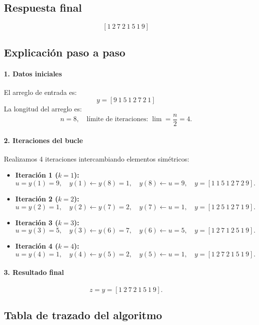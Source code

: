 \documentclass[12pt]{article}
\begin{document}
\subsection*{Respuesta final}

\[
\boxed{[1\ 2\ 7\ 2\ 1\ 5\ 1\ 9]}
\]

\subsection*{Explicación paso a paso}

\paragraph{1. Datos iniciales}

El arreglo de entrada es:
\[
y = [9\ 1\ 5\ 1\ 2\ 7\ 2\ 1]
\]
La longitud del arreglo es:
\[
n = 8,\quad \text{límite de iteraciones: } \lim = \frac{n}{2} = 4.
\]

\paragraph{2. Iteraciones del bucle}

Realizamos 4 iteraciones intercambiando elementos simétricos:

\begin{itemize}
  \item \textbf{Iteración 1 ($k=1$):}
  \[
    u = y(1) = 9,\quad
    y(1) \gets y(8)=1,\quad
    y(8)\gets u=9,\quad
    y = [1\ 1\ 5\ 1\ 2\ 7\ 2\ 9].
  \]
  \item \textbf{Iteración 2 ($k=2$):}
  \[
    u = y(2) = 1,\quad
    y(2)\gets y(7)=2,\quad
    y(7)\gets u=1,\quad
    y = [1\ 2\ 5\ 1\ 2\ 7\ 1\ 9].
  \]
  \item \textbf{Iteración 3 ($k=3$):}
  \[
    u = y(3) = 5,\quad
    y(3)\gets y(6)=7,\quad
    y(6)\gets u=5,\quad
    y = [1\ 2\ 7\ 1\ 2\ 5\ 1\ 9].
  \]
  \item \textbf{Iteración 4 ($k=4$):}
  \[
    u = y(4) = 1,\quad
    y(4)\gets y(5)=2,\quad
    y(5)\gets u=1,\quad
    y = [1\ 2\ 7\ 2\ 1\ 5\ 1\ 9].
  \]
\end{itemize}

\paragraph{3. Resultado final}

\[
z = y = [1\ 2\ 7\ 2\ 1\ 5\ 1\ 9].
\]

\subsection*{Tabla de trazado del algoritmo}
\end{document}

